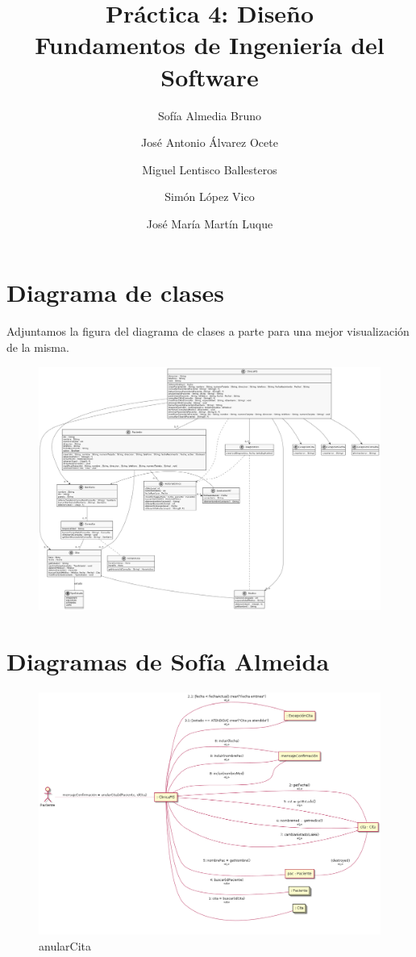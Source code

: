 \documentclass[11pt,a4paper]{article}
\title{Práctica 4: Diseño \large\\ Fundamentos de Ingeniería del Software}
\author{Sofía Almedia Bruno \and José Antonio Álvarez Ocete \and Miguel Lentisco Ballesteros \and Simón López Vico \and José María Martín Luque}
\begin{document}
\maketitle

\section{Diagrama de clases}

Adjuntamos la figura del diagrama de clases a parte para una mejor visualización de la misma. \\

\begin{figure}[H]
	\centering
	\includegraphics[width=\textwidth,height=\textheight,keepaspectratio]{Diagramas/diagramaClases}
\end{figure}

\section{Diagramas de Sofía Almeida}

\begin{figure}[H]
	\caption{anularCita}
	\centering
	\includegraphics[width=\textwidth,height=\textheight,keepaspectratio]{Diagramas/anularcita}
\end{figure}
\end{document}

